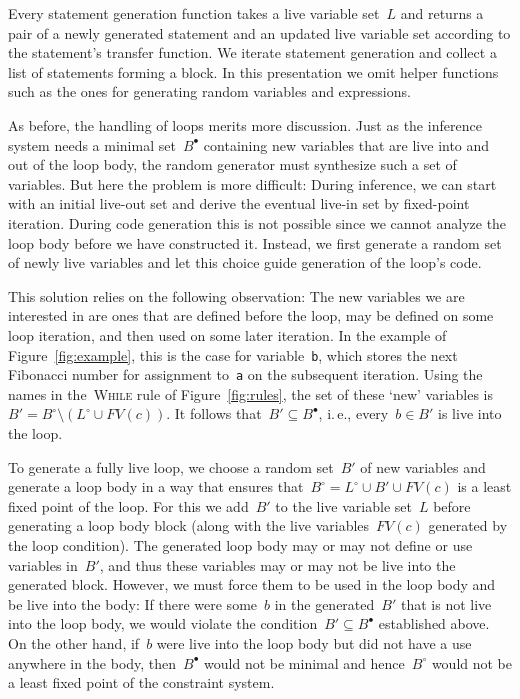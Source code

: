 \documentclass[a4paper]{easychair}
\newcommand{\liveout}[1]{\ensuremath{#1^{\circ}}}
\newcommand{\livein}[1]{\ensuremath{#1^{\bullet}}}
\def\union{\cup}
\begin{document}
Every statement generation function takes a live variable set~\(L\) and
returns a pair of a newly generated statement and an updated live variable
set according to the statement's transfer function.
We iterate statement generation and collect a list of statements
forming a block. In this presentation we omit helper functions such as the
ones for generating random variables and expressions.

As before, the handling of loops merits more discussion. Just as the
inference system needs a minimal set~\(\livein{B}\) containing new variables
that are live into and out of the loop body, the random generator must
synthesize such a set of variables. But here the problem is more difficult:
During inference, we can start with an initial live-out set and derive the
eventual live-in set by fixed-point iteration. During code generation this
is not possible since we cannot analyze the loop body before we have
constructed it. Instead, we first generate a random set of newly live
variables and let this choice guide generation of the loop's code.

This solution relies on the following observation: The new variables we are
interested in are ones that are defined before the loop, may be defined on
some loop iteration, and then used on some later iteration. In the example
of Figure~\ref{fig:example}, this is the case for variable~\verb|b|, which
stores the next Fibonacci number for assignment to~\verb|a| on the
subsequent iteration. Using the names in the~\textsc{While} rule of
Figure~\ref{fig:rules}, the set of these `new' variables is~\(B' =
\liveout{B} \setminus (\liveout{L} \union FV(c))\). It follows that~\(B'
\subseteq \livein{B}\), i.\,e., every~\(b \in B'\) is live into the loop.

To generate a fully live loop, we choose a random set~\(B'\) of new
variables and generate a loop body in a way that ensures that~\(\liveout{B}
= \liveout{L} \union B' \union FV(c)\) is a least fixed point of the loop.
For this we add~\(B'\) to the live variable set~\(L\)
before generating a loop body block (along with the live variables~\(FV(c)\)
generated by the loop condition). The generated loop body may or may not
define or use variables in~\(B'\), and thus these variables may or may not
be live into the generated block. However, we must force them to be used in
the loop body and be live into the body: If there were some~\(b\) in the
generated~\(B'\) that is not live into the loop body, we would violate the
condition~\(B' \subseteq \livein{B}\) established above. On the other hand,
if~\(b\) were live into the loop body but did not have a use anywhere in the
body, then~\(\livein{B}\) would not be minimal and hence~\(\liveout{B}\)
would not be a least fixed point of the constraint system.
\end{document}

